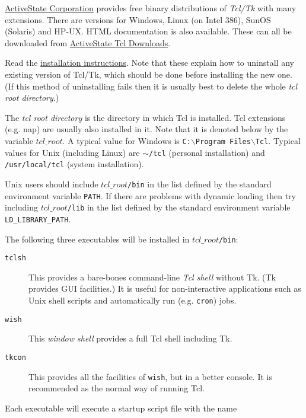   \href{http://aspn.activestate.com/ASPN//}{ActiveState Corporation} provides free binary distributions of 
  \emph{Tcl/Tk} with many extensions. There are versions for Windows,
  Linux (on Intel 386), SunOS (Solaris) and HP-UX. HTML documentation
  is also available. These can all be downloaded from 
  \href{http://aspn.activestate.com/ASPN/Tcl/Downloads/}{ActiveState Tcl Downloads}.
  \par Read the 
  \href{http://aspn.activestate.com/ASPN/docs/ActiveTcl/at.install.html}{ installation instructions}. Note that these explain how to
  uninstall any existing version of Tcl/Tk, which should be done before
  installing the new one. (If this method of uninstalling fails then it
  is usually best to delete the whole 
  \emph{tcl root directory}.)
  \par The 
  \emph{tcl root directory} is the directory in which Tcl is
  installed. Tcl extensions (e.g. nap) are usually also installed in
  it. Note that it is denoted below by the variable 
  $tcl\_root$. A typical value for Windows is 
  \texttt{C:$\backslash$Program\ Files$\backslash$Tcl}. Typical values for Unix
  (including Linux) are 
  \texttt{$\sim$/tcl} (personal installation) and 
  \texttt{/usr/local/tcl} (system installation).
  \par Unix users should include 
  $tcl\_root$\texttt{/bin} in the list defined by the standard environment
  variable 
  \texttt{PATH}. If there are problems with dynamic loading then
  try including 
  $tcl\_root$\texttt{/lib} in the list defined by the standard environment
  variable 
  \texttt{LD\_LIBRARY\_PATH}.
  \par The following three executables will be installed in 
  $tcl\_root$\texttt{/bin}:
  \begin{description}
    \item[
      \texttt{tclsh}
    ]
    This provides a bare-bones command-line 
    \emph{Tcl shell} without Tk. (Tk provides GUI facilities.) It is
    useful for non-interactive applications such as Unix shell scripts
    and automatically run (e.g. 
    \texttt{cron}) jobs.
    \item[
      \texttt{wish}
    ]
    This 
    \emph{window shell} provides a full Tcl shell including Tk.
    \item[
      \texttt{tkcon}
    ]
    This provides all the facilities of 
    \texttt{wish}, but in a better console. It is recommended as
    the normal way of running Tcl.
  \end{description}
  \par Each executable will execute a startup script file with the name
